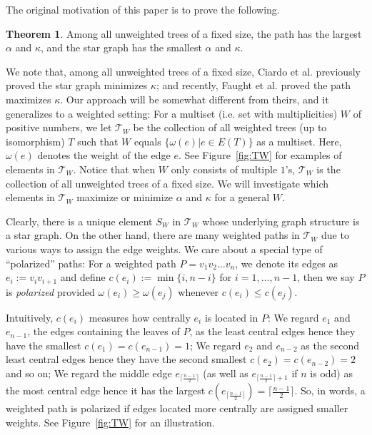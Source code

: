 \documentclass[11pt]{article}
\theoremstyle{definition}
\newtheorem{theorem}{Theorem}[section]
\begin{document}
The original motivation of this paper is to prove the following.
\begin{theorem}\label{minmax_unweighted}
Among all unweighted trees of a fixed size, the path has the largest $\alpha$ and $\kappa$, and the star graph has the smallest $\alpha$ and $\kappa$.
\end{theorem}

We note that, among all unweighted trees of a fixed size, Ciardo et al. \cite{ciardo2022kemeny} previously proved the star graph minimizes $\kappa$; and recently, Faught et al. \cite{faught20221} proved the path maximizes $\kappa$. Our approach will be somewhat different from theirs, and it generalizes to a weighted setting: For a multiset (i.e. set with multiplicities) $W$ of positive numbers, we let $\mathcal{T}_W$ be the collection of all weighted trees (up to isomorphism) $T$ such that $W$ equals $\{\omega(e)| e\in E(T)\}$ as a multiset. Here, $\omega(e)$ denotes the weight of the edge $e$. See Figure~\ref{fig:TW} for examples of elements in $\mathcal{T}_W$. Notice that when $W$ only consists of multiple $1$'s, $\mathcal{T}_W$ is the collection of all unweighted trees of a fixed size. We will investigate which elements in $\mathcal{T}_W$ maximize or minimize $\alpha$ and $\kappa$ for a general $W$.

Clearly, there is a unique element $S_W$ in $\mathcal{T}_W$ whose underlying graph structure is a star graph. On the other hand, there are many weighted paths in $\mathcal{T}_W$ due to various ways to assign the edge weights. We care about a special type of ``polarized'' paths: For a weighted path $P=v_1v_2\dots v_n$, we denote its edges as $e_i:=v_{i}v_{i+1}$ and define $c(e_i):=\min\{i,n-i\}$ for $i=1,\dots,n-1$, then we say $P$ is \emph{polarized} provided $\omega(e_i) \geq \omega(e_j)$ whenever $c(e_i) \leq c(e_j)$.

Intuitively, $c(e_i)$ measures how centrally $e_i$ is located in $P$: We regard $e_1$ and $e_{n-1}$, the edges containing the leaves of $P$, as the least central edges hence they have the smallest $c(e_1)=c(e_{n-1})=1$; We regard $e_{2}$ and $e_{n-2}$ as the second least central edges hence they have the second smallest $c(e_2)=c(e_{n-2})=2$ and so on; We regard the middle edge $e_{\lceil\frac{n-1}{2} \rceil}$ (as well as $e_{\lceil\frac{n-1}{2} \rceil + 1}$ if $n$ is odd) as the most central edge hence it has the largest $c\left(e_{\lceil\frac{n-1}{2} \rceil}\right)=\lceil\frac{n-1}{2} \rceil$. So, in words, a weighted path is polarized if edges located more centrally are assigned smaller weights. See Figure~\ref{fig:TW} for an illustration.
\end{document}
